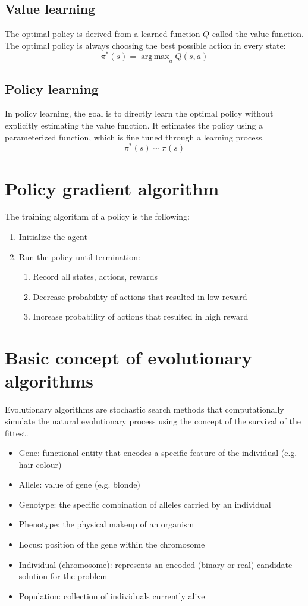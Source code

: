 \documentclass[a4paper,12pt,answers]{article}
\DeclareMathOperator*{\argmax}{arg\,max}
\begin{document}
	\subsection{Value learning}
	The optimal policy is derived from a learned function $Q$ called the value function. The optimal policy is always choosing the best possible action in every state:
	\[
	\pi^*(s) = \argmax_{a}{Q(s,a)}
	\]
	
	\subsection{Policy learning}
	In policy learning, the goal is to directly learn the optimal policy without explicitly estimating the value function. It estimates the policy using a parameterized function, which is fine tuned through a learning process.
	\[
	\pi^*(s) \sim \pi(s)
	\]
	
	
	
	\section{Policy gradient algorithm}
	The training algorithm of a policy is the following:
	\begin{enumerate}
		\item Initialize the agent
		\item Run the policy until termination:
		\begin{enumerate}
			\item Record all states, actions, rewards
			\item Decrease probability of actions that resulted in low reward
			\item Increase probability of actions that resulted in high reward
		\end{enumerate}
	\end{enumerate}
	
	
	
	\newpage
	\section{Basic concept of evolutionary algorithms}
	Evolutionary algorithms are stochastic search methods that computationally simulate the natural evolutionary process using the concept of the survival of the fittest.
	\begin{itemize}
		\item Gene: functional entity that encodes a specific feature of the individual (e.g. hair colour)
		\item Allele: value of gene (e.g. blonde)
		\item Genotype: the specific combination of alleles carried by an individual
		\item Phenotype: the physical makeup of an organism
		\item Locus: position of the gene within the chromosome
		\item Individual (chromosome): represents an encoded (binary or real) candidate solution for the problem
		\item Population: collection of individuals currently alive
	\end{itemize}
	
\end{document}
